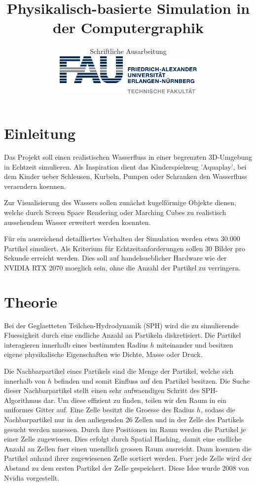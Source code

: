 \documentclass[a4paper]{paper}
\title{Physikalisch-basierte Simulation in der Computergraphik}
\subtitle{Schriftliche Ausarbeitung\\
\hfill\includegraphics[height=2cm]{fau-logo-tech.pdf}
\vspace{-2cm}}
\author{\ProjectTitle}
\newcommand{\StudentNames}{Liste der Studierenden}
\begin{document}
 
\twocolumn[\maketitle 
\textbf{\StudentNames} \\
\hrule\bigskip
]


\section{Einleitung} 

Das Projekt soll einen realistischen Wasserfluss in einer begrenzten 3D-Umgebung in Echtzeit simulieren. %
Als Inspiration dient das Kinderspielzeug 'Aquaplay', bei dem Kinder ueber Schleusen, Kurbeln, Pumpen oder Schranken den Wasserfluss veraendern koennen. 

Zur Visualisierung des Wassers sollen zunächst kugelförmige Objekte dienen, welche durch Screen Space Rendering oder Marching Cubes zu realistisch aussehendem Wasser erweitert werden koennten. 

Für ein ausreichend detailliertes Verhalten der Simulation werden etwa 30.000 Partikel simuliert. Als Kriterium für Echtzeitanforderungen sollen 30 Bilder pro Sekunde erreicht werden. Dies soll auf handelsueblicher Hardware wie der NVIDIA RTX 2070 moeglich sein, ohne die Anzahl der Partikel zu verringern. 

\section{Theorie}
Bei der Geglaetteten Teilchen-Hydrodynamik (SPH) wird die zu simulierende Fluessigkeit durch eine endliche Anzahl an Partikeln diskretisiert. Die Partikel interagieren innerhalb eines bestimmten Radius $h$ miteinander und besitzen eigene physikalische Eigenschaften wie  Dichte, Masse oder Druck.

Die Nachbarpartikel eines Partikels sind die Menge der Partikel, welche sich innerhalb von $h$ befinden und somit Einfluss auf den Partikel besitzen. Die Suche dieser Nachbarpartikel stellt einen sehr aufwaendigen Schritt des SPH-Algorithmus dar. Um diese effizient zu finden, teilen wir den Raum in ein uniformes Gitter auf. Eine Zelle besitzt die Groesse des Radius $h$, sodass die Nachbarpartikel nur in den anliegenden 26 Zellen und in der Zelle des Partikels gesucht werden muessen. Durch ihre Positionen im Raum werden die Partikel je einer Zelle zugewiesen. Dies erfolgt durch Spatial Hashing, damit eine endliche Anzahl an Zellen fuer einen unendlich grossen Raum ausreicht. Dann koennen die Partikel anhand ihrer zugewiesenen Zelle sortiert werden. Fuer jede Zelle wird der Abstand zu dem ersten Partikel der Zelle gespeichert. Diese Idee wurde 2008 von Nvidia vorgestellt. \cite{Nvidia}
\end{document}

